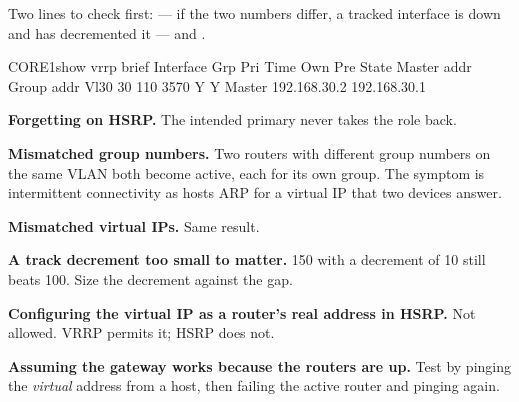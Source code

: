 Two lines to check first:  --- if the two
numbers differ, a tracked interface is down and has decremented it --- and
.

\begin{verify}{CORE1}{show vrrp brief}
Interface          Grp Pri Time    Own Pre State   Master addr     Group addr
Vl30               30  110 3570     Y  Y   Master  192.168.30.2    192.168.30.1
\end{verify}

\begin{pitfall}
\begin{tight}
  \item \textbf{Forgetting  on HSRP.} The intended primary never
        takes the role back.
  \item \textbf{Mismatched group numbers.} Two routers with different group
        numbers on the same VLAN both become active, each for its own group. The
        symptom is intermittent connectivity as hosts ARP for a virtual IP that
        two devices answer.
  \item \textbf{Mismatched virtual IPs.} Same result.
  \item \textbf{A track decrement too small to matter.} 150 with a decrement of
        10 still beats 100. Size the decrement against the gap.
  \item \textbf{Configuring the virtual IP as a router's real address in HSRP.}
        Not allowed. VRRP permits it; HSRP does not.
  \item \textbf{Assuming the gateway works because the routers are up.} Test by
        pinging the \emph{virtual} address from a host, then failing the active
        router and pinging again.
\end{tight}
\end{pitfall}

